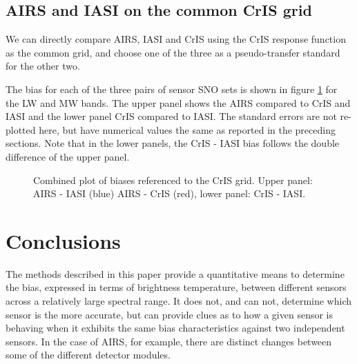 \documentclass[11pt]{article}
\begin{document}
\subsection{AIRS and IASI on the common CrIS grid}
\label{sec:orgheadline11}
 We can directly compare AIRS, IASI and CrIS using the CrIS response function as the common grid, and choose one of the three as a pseudo-transfer standard for the other two.

The bias for each of the three pairs of sensor SNO sets is shown in figure \ref{fig:U1} for the LW and MW bands. The upper panel shows the AIRS compared to CrIS and IASI and the lower panel CrIS compared to IASI.  The standard errors are not re-plotted here, but have numerical values the same as reported in the preceding sections. Note that in the lower panels, the CrIS - IASI bias follows the double difference of the upper panel.  


\begin{figure}[htb]
  \centering
  \quad
  \caption{\label{fig:orgparagraph21}
    Combined plot of biases referenced to the CrIS grid. Upper panel: AIRS - IASI (blue) AIRS - CrIS (red), lower panel: CrIS - IASI.}
  \label{fig:U1}
\end{figure}


\section{Conclusions}
\label{sec:orgheadline13}
The methods described in this paper provide a quantitative means to determine the bias, expressed in terms of brightness temperature, between different sensors across a relatively large spectral range. It does not, and can not, determine which sensor is the more accurate, but can provide clues as to how a given sensor is behaving when it exhibits the same bias characteristics against two independent sensors. In the case of AIRS, for example, there are distinct changes between some of the different detector modules.
\end{document}
